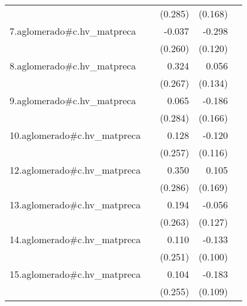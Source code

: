 {\begin{longtable}{l*{4}{D{.}{.}{-1}}}
            &                     &     (0.285)         &     (0.168)         &                     \\
\addlinespace
7.aglomerado#c.hv\_matpreca&                     &      -0.037         &      -0.298\sym{*}  &                     \\
            &                     &     (0.260)         &     (0.120)         &                     \\
\addlinespace
8.aglomerado#c.hv\_matpreca&                     &       0.324         &       0.056         &                     \\
            &                     &     (0.267)         &     (0.134)         &                     \\
\addlinespace
9.aglomerado#c.hv\_matpreca&                     &       0.065         &      -0.186         &                     \\
            &                     &     (0.284)         &     (0.166)         &                     \\
\addlinespace
10.aglomerado#c.hv\_matpreca&                     &       0.128         &      -0.120         &                     \\
            &                     &     (0.257)         &     (0.116)         &                     \\
\addlinespace
12.aglomerado#c.hv\_matpreca&                     &       0.350         &       0.105         &                     \\
            &                     &     (0.286)         &     (0.169)         &                     \\
\addlinespace
13.aglomerado#c.hv\_matpreca&                     &       0.194         &      -0.056         &                     \\
            &                     &     (0.263)         &     (0.127)         &                     \\
\addlinespace
14.aglomerado#c.hv\_matpreca&                     &       0.110         &      -0.133         &                     \\
            &                     &     (0.251)         &     (0.100)         &                     \\
\addlinespace
15.aglomerado#c.hv\_matpreca&                     &       0.104         &      -0.183         &                     \\
            &                     &     (0.255)         &     (0.109)         &                     \\

\end{longtable}}
